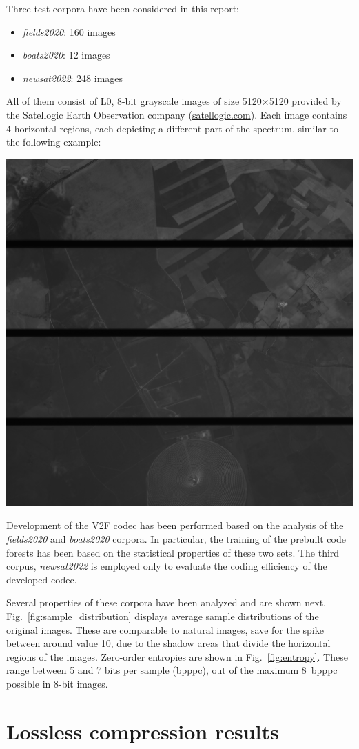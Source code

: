 \documentclass{class/technicalReportUAB}
\begin{document}
Three test corpora have been considered in this report: 
\begin{itemize}
\item \textit{fields2020}: 160 images
\item \textit{boats2020}: 12 images
\item \textit{newsat2022}: 248 images
\end{itemize}
All of them consist of L0, 8-bit grayscale images of size 5120$\times$5120 provided by the Satellogic Earth Observation company (\url{satellogic.com}).
Each image contains 4 horizontal regions, each depicting a different part of the spectrum, similar to the following example:

\begin{center}
\includegraphics[width=0.5\linewidth]{./plots/dataset_analysis/corpus_sample.png}
\end{center}

Development of the V2F codec has been performed based on the analysis of the \textit{fields2020} and \textit{boats2020} corpora.
In particular, the training of the prebuilt code forests has been based on the statistical properties of these two sets.
The third corpus, \textit{newsat2022} is employed only to evaluate the coding efficiency of the developed codec.

Several properties of these corpora have been analyzed and are shown next. 
% 
Fig.~\ref{fig:sample_distribution} displays average sample distributions of the original images. These are comparable
to natural images, save for the spike between around value 10, due to the shadow areas that divide the horizontal regions of the images.
% 
Zero-order entropies are shown in Fig.~\ref{fig:entropy}. These range between 5 and 7 bits per sample (bpppc), out of the maximum 8~bpppc
possible in 8-bit images.

\section{Lossless compression results}\label{sec:lossless_results}
\end{document}
